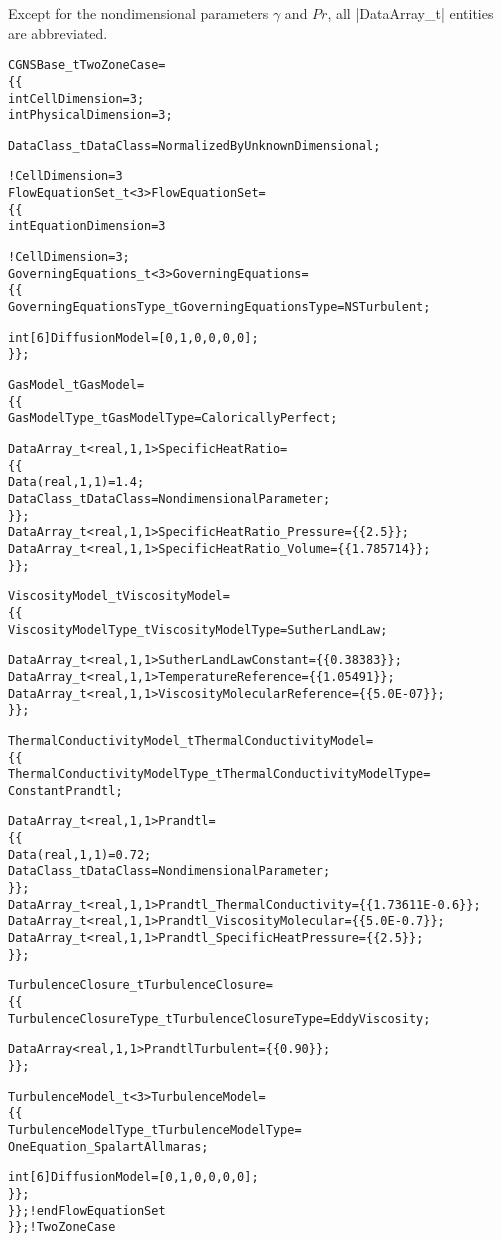 Except for the nondimensional parameters $\gamma$ and $Pr$, all
|DataArray_t| entities are abbreviated.
\begin{alltt}
CGNSBase\_t TwoZoneCase =
  \{\{
  int CellDimension = 3 ;
  int PhysicalDimension = 3 ;

  DataClass\_t DataClass = NormalizedByUnknownDimensional ;

  !  CellDimension = 3
  FlowEquationSet\_t<3> FlowEquationSet = 
    \{\{
    int EquationDimension = 3
    
    !  CellDimension = 3 ;
    GoverningEquations\_t<3> GoverningEquations =
      \{\{
      GoverningEquationsType\_t GoverningEquationsType = NSTurbulent ;
      
      int[6] DiffusionModel = [0,1,0,0,0,0] ;
      \}\} ;
      
    GasModel\_t GasModel =
      \{\{
      GasModelType\_t GasModelType = CaloricallyPerfect ;
      
      DataArray\_t<real, 1, 1> SpecificHeatRatio =
        \{\{
        Data(real, 1, 1) = 1.4 ;
        DataClass\_t DataClass = NondimensionalParameter ;
        \}\} ;
      DataArray\_t<real, 1, 1> SpecificHeatRatio\_Pressure = \{\{ 2.5 \}\} ;
      DataArray\_t<real, 1, 1> SpecificHeatRatio\_Volume   = \{\{ 1.785714 \}\} ;
      \}\} ;

    ViscosityModel\_t ViscosityModel =
      \{\{
      ViscosityModelType\_t ViscosityModelType = SutherLandLaw ;
      
      DataArray\_t<real, 1, 1> SutherLandLawConstant       = \{\{ 0.38383 \}\} ;
      DataArray\_t<real, 1, 1> TemperatureReference        = \{\{ 1.05491 \}\} ;
      DataArray\_t<real, 1, 1> ViscosityMolecularReference = \{\{ 5.0E-07 \}\} ;
      \}\} ;

    ThermalConductivityModel\_t ThermalConductivityModel =
      \{\{
      ThermalConductivityModelType\_t ThermalConductivityModelType = 
        ConstantPrandtl ;
      
      DataArray\_t<real, 1, 1> Prandtl = 
        \{\{
        Data(real, 1, 1) = 0.72 ;
        DataClass\_t DataClass = NondimensionalParameter ;
        \}\} ;
      DataArray\_t<real, 1, 1> Prandtl\_ThermalConductivity  = \{\{ 1.73611E-0.6 \}\} ;
      DataArray\_t<real, 1, 1> Prandtl\_ViscosityMolecular   = \{\{ 5.0E-0.7 \}\} ;
      DataArray\_t<real, 1, 1> Prandtl\_SpecificHeatPressure = \{\{ 2.5 \}\} ;
      \}\} ;

    TurbulenceClosure\_t TurbulenceClosure =
      \{\{
      TurbulenceClosureType\_t TurbulenceClosureType = EddyViscosity ;
      
      DataArray<real, 1, 1> PrandtlTurbulent = \{\{ 0.90 \}\} ;
      \}\} ;
      
    TurbulenceModel\_t<3> TurbulenceModel =
      \{\{
      TurbulenceModelType\_t TurbulenceModelType = 
        OneEquation\_SpalartAllmaras ;
      
      int[6] DiffusionModel = [0,1,0,0,0,0] ;
      \}\} ;      
    \}\} ;        ! end FlowEquationSet
  \}\} ;          ! TwoZoneCase
\end{alltt}
